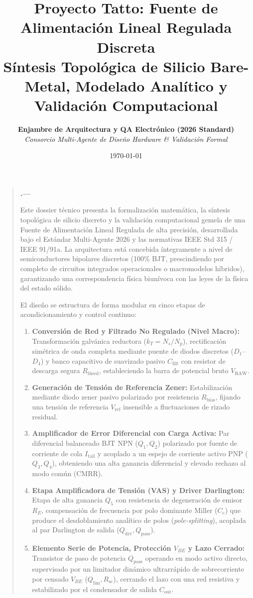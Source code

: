 \documentclass[11pt,a4paper,titlepage,oneside]{book}
\title{%
    \vspace{-1.5cm}
    \textbf{\huge Proyecto Tatto: Fuente de Alimentación Lineal Regulada Discreta}\\[0.6cm]
    \Large Síntesis Topológica de Silicio Bare-Metal, Modelado Analítico y Validación Computacional
}
\author{%
    \textbf{Enjambre de Arquitectura y QA Electrónico (2026 Standard)}\\[0.2cm]
    \textit{Consorcio Multi-Agente de Diseño Hardware \& Validación Formal}
}
\date{\today}
\newenvironment{abstract}{%
    \begin{quotation}\small\noindent\textbf{\abstractname.---}\ignorespaces
}{%
    \end{quotation}\par\bigskip
}
\begin{document}
\frontmatter

\maketitle

\begin{abstract}
Este dossier técnico presenta la formalización matemática, la síntesis topológica de silicio discreto y la validación computacional gemela de una Fuente de Alimentación Lineal Regulada de alta precisión, desarrollada bajo el Estándar Multi-Agente 2026 y las normativas IEEE Std 315 / IEEE 91/91a. La arquitectura está concebida íntegramente a nivel de semiconductores bipolares discretos (100\% BJT, prescindiendo por completo de circuitos integrados operacionales o macromodelos híbridos), garantizando una correspondencia física biunívoca con las leyes de la física del estado sólido.

El diseño se estructura de forma modular en cinco etapas de acondicionamiento y control continuo:
\begin{enumerate}
    \item \textbf{Conversión de Red y Filtrado No Regulado (Nivel Macro):} Transformación galvánica reductora ($k_T = N_s/N_p$), rectificación simétrica de onda completa mediante puente de diodos discretos ($D_1$--$D_4$) y banco capacitivo de suavizado pasivo $C_{\mathrm{filt}}$ con resistor de descarga segura $R_{\mathrm{bleed}}$, estableciendo la barra de potencial bruto $V_{\mathrm{RAW}}$.
    \item \textbf{Generación de Tensión de Referencia Zener:} Estabilización mediante diodo zener pasivo polarizado por resistencia $R_{\mathrm{bias}}$, fijando una tensión de referencia $V_{\mathrm{ref}}$ insensible a fluctuaciones de rizado residual.
    \item \textbf{Amplificador de Error Diferencial con Carga Activa:} Par diferencial balanceado BJT NPN ($Q_1, Q_2$) polarizado por fuente de corriente de cola $I_{\mathrm{tail}}$ y acoplado a un espejo de corriente activo PNP ($Q_3, Q_4$), obteniendo una alta ganancia diferencial y elevado rechazo al modo común (CMRR).
    \item \textbf{Etapa Amplificadora de Tensión (VAS) y Driver Darlington:} Etapa de alta ganancia $Q_5$ con resistencia de degeneración de emisor $R_E$, compensación de frecuencia por polo dominante Miller ($C_c$) que produce el desdoblamiento analítico de polos (\textit{pole-splitting}), acoplada al par Darlington de salida ($Q_{\mathrm{drv}}, Q_{\mathrm{pass}}$).
    \item \textbf{Elemento Serie de Potencia, Protección $V_{BE}$ y Lazo Cerrado:} Transistor de paso de potencia $Q_{\mathrm{pass}}$ operando en modo activo directo, supervisado por un limitador dinámico ultrarrápido de sobrecorriente por censado $V_{BE}$ ($Q_{\mathrm{lim}}, R_{\mathrm{sc}}$), cerrando el lazo con una red resistiva y estabilizado por el condensador de salida $C_{\mathrm{out}}$.
\end{enumerate}


\end{abstract}
\end{document}
